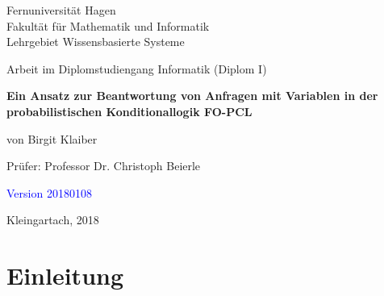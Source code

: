 \documentclass[a4paper, 11pt]{book}
\begin{document}
\begin{titlepage}
\thispagestyle{empty}
\begin{center}
\Large{Fernuniversität Hagen}\\
\Large{Fakultät für Mathematik und Informatik}\\
\Large{Lehrgebiet Wissensbasierte Systeme}\\[1.5cm]
\end{center}


\begin{center}
{Arbeit im Diplomstudiengang Informatik (Diplom I)}\\[2.0cm]
\end{center}

\begin{center}


\LARGE \textbf{Ein Ansatz zur Beantwortung von Anfragen mit Variablen in der probabilistischen Konditionallogik FO-PCL}\\[3.5cm]
\end{center}


\begin{center}
\large{von Birgit Klaiber}\\[3.5cm]
\end{center}

\begin{center}
\large{Prüfer: Professor Dr. Christoph Beierle }\\[1.0cm]
\end{center}

\begin{center}
\textcolor{blue}{Version 20180108}
	
\large{Kleingartach, 2018}
\end{center}

\end{titlepage}






\begingroup



\setcounter{tocdepth}{1}

\tableofcontents
\clearpage
\endgroup
{}
\pagestyle{plain}
\setcounter{page}{1}
\pagestyle{headings}


\setlength{\parskip}{5pt}




\chapter{Einleitung}
\end{document}

